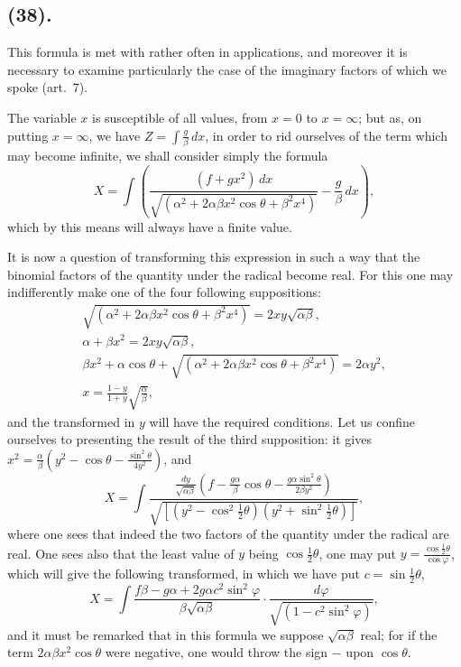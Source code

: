 \documentclass{article}
\begin{document}
\subsection*{(38).}

This formula is met with rather often in applications, and moreover it is necessary to examine particularly the case of the imaginary factors of which we spoke (art.~7).


The variable $x$ is susceptible of all values, from $x=0$ to $x=\infty$; but as, on putting $x=\infty$, we have $Z=\displaystyle\int\frac{g}{\beta}\,dx$, in order to rid ourselves of the term which may become infinite, we shall consider simply the formula
\[ X=\int\left(\frac{(f+gx^{2})\,dx}{\sqrt{(\alpha^{2}+2\alpha\beta x^{2}\cos\theta+\beta^{2}x^{4})}}-\frac{g}{\beta}\,dx\right), \]
which by this means will always have a finite value.

It is now a question of transforming this expression in such a way that the binomial factors of the quantity under the radical become real. For this one may indifferently make one of the four following suppositions:
\[ \begin{gathered} \sqrt{(\alpha^{2}+2\alpha\beta x^{2}\cos\theta+\beta^{2}x^{4})}=2xy\sqrt{\alpha\beta},\\ \alpha+\beta x^{2}=2xy\sqrt{\alpha\beta},\\ \beta x^{2}+\alpha\cos\theta+\sqrt{(\alpha^{2}+2\alpha\beta x^{2}\cos\theta+\beta^{2}x^{4})}=2\alpha y^{2},\\ x=\frac{1-y}{1+y}\sqrt{\frac{\alpha}{\beta}}, \end{gathered} \]
and the transformed in $y$ will have the required conditions. Let us confine ourselves to presenting the result of the third supposition: it gives $x^{2}=\frac{\alpha}{\beta}\left(y^{2}-\cos\theta-\frac{\sin^{2}\theta}{4y^{2}}\right)$, and
\[ X=\int\frac{\frac{dy}{\sqrt{\alpha\beta}}\left(f-\frac{g\alpha}{\beta}\cos\theta-\frac{g\alpha\sin^{2}\theta}{2\beta y^{2}}\right)}{\sqrt{[(y^{2}-\cos^{2}\tfrac{1}{2}\theta)(y^{2}+\sin^{2}\tfrac{1}{2}\theta)]}}, \]
where one sees that indeed the two factors of the quantity under the radical are real. One sees also that the least value of $y$ being $\cos\frac{1}{2}\theta$, one may put $y=\frac{\cos\frac{1}{2}\theta}{\cos\varphi}$, which will give the following transformed, in which we have put $c=\sin\frac{1}{2}\theta$,
\[ X=\int\frac{f\beta-g\alpha+2g\alpha c^{2}\sin^{2}\varphi}{\beta\sqrt{\alpha\beta}}\cdot\frac{d\varphi}{\sqrt{(1-c^{2}\sin^{2}\varphi)}}, \]
and it must be remarked that in this formula we suppose $\sqrt{\alpha\beta}$ real; for if the term $2\alpha\beta x^{2}\cos\theta$ were negative, one would throw the sign $-$ upon $\cos\theta$.
\end{document}
